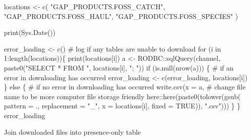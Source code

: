 \documentclass[
  letterpaper,
  oneside,
  open=any]{scrbook}
\newenvironment{Shaded}{\begin{snugshade}}{\end{snugshade}}
\newcommand{\AttributeTok}[1]{\textcolor[rgb]{0.40,0.45,0.13}{#1}}
\newcommand{\CommentTok}[1]{\textcolor[rgb]{0.37,0.37,0.37}{#1}}
\newcommand{\ConstantTok}[1]{\textcolor[rgb]{0.56,0.35,0.01}{#1}}
\newcommand{\ControlFlowTok}[1]{\textcolor[rgb]{0.00,0.23,0.31}{#1}}
\newcommand{\DecValTok}[1]{\textcolor[rgb]{0.68,0.00,0.00}{#1}}
\newcommand{\FunctionTok}[1]{\textcolor[rgb]{0.28,0.35,0.67}{#1}}
\newcommand{\NormalTok}[1]{\textcolor[rgb]{0.00,0.23,0.31}{#1}}
\newcommand{\OtherTok}[1]{\textcolor[rgb]{0.00,0.23,0.31}{#1}}
\newcommand{\SpecialCharTok}[1]{\textcolor[rgb]{0.37,0.37,0.37}{#1}}
\newcommand{\StringTok}[1]{\textcolor[rgb]{0.13,0.47,0.30}{#1}}
\begin{document}
\begin{Shaded}
\begin{Highlighting}[]
\NormalTok{locations }\OtherTok{\textless{}{-}} \FunctionTok{c}\NormalTok{(}
  \StringTok{"GAP\_PRODUCTS.FOSS\_CATCH"}\NormalTok{,}
  \StringTok{"GAP\_PRODUCTS.FOSS\_HAUL"}\NormalTok{,}
  \StringTok{"GAP\_PRODUCTS.FOSS\_SPECIES"}
\NormalTok{)}

\FunctionTok{print}\NormalTok{(}\FunctionTok{Sys.Date}\NormalTok{())}

\NormalTok{error\_loading }\OtherTok{\textless{}{-}} \FunctionTok{c}\NormalTok{() }\CommentTok{\# log if any tables are unable to download }
\ControlFlowTok{for}\NormalTok{ (i }\ControlFlowTok{in} \DecValTok{1}\SpecialCharTok{:}\FunctionTok{length}\NormalTok{(locations))\{}
  \FunctionTok{print}\NormalTok{(locations[i])}
\NormalTok{  a }\OtherTok{\textless{}{-}}\NormalTok{ RODBC}\SpecialCharTok{::}\FunctionTok{sqlQuery}\NormalTok{(channel, }\FunctionTok{paste0}\NormalTok{(}\StringTok{"SELECT * FROM "}\NormalTok{, locations[i], }\StringTok{"; "}\NormalTok{))}
  \ControlFlowTok{if}\NormalTok{ (}\FunctionTok{is.null}\NormalTok{(}\FunctionTok{nrow}\NormalTok{(a))) \{ }\CommentTok{\# if an error in downloading has occurred}
\NormalTok{    error\_loading }\OtherTok{\textless{}{-}} \FunctionTok{c}\NormalTok{(error\_loading, locations[i])}
\NormalTok{  \} }\ControlFlowTok{else}\NormalTok{ \{ }\CommentTok{\# if no error in downloading has occurred}
    \FunctionTok{write.csv}\NormalTok{(}\AttributeTok{x =}\NormalTok{ a, }
              \CommentTok{\# change file name to be more computer file storage friendly}
\NormalTok{              here}\SpecialCharTok{::}\FunctionTok{here}\NormalTok{(}\FunctionTok{paste0}\NormalTok{(}\FunctionTok{tolower}\NormalTok{(}\FunctionTok{gsub}\NormalTok{(}
                \AttributeTok{pattern =} \StringTok{\textquotesingle{}.\textquotesingle{}}\NormalTok{, }
                \AttributeTok{replacement =} \StringTok{"\_"}\NormalTok{, }
                \AttributeTok{x =}\NormalTok{ locations[i], }
                \AttributeTok{fixed =} \ConstantTok{TRUE}\NormalTok{)),}
                \StringTok{".csv"}\NormalTok{)))}
\NormalTok{  \}}
\NormalTok{\}}
\NormalTok{error\_loading}
\end{Highlighting}
\end{Shaded}

Join downloaded files into presence-only table
\end{document}
